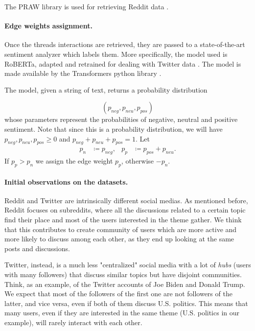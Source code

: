 The PRAW library is used for retrieving Reddit data \cite{praw}.

\paragraph{Edge weights assignment.}%
\label{par:assigning_edge_weights}

Once the threads interactions are retrieved, they are passed to a state-of-the-art
sentiment analyzer which labels them. More specifically, the model used is
RoBERTa, adapted and retrained for dealing with Twitter
data \cite{Barbieri2020}. The model is made available by the Transformers
python library \cite{wolf-etal-2020-transformers}.

The model, given a string of text, returns a probability distribution

\begin{equation*}
	(p_{neg}, p_{neu}, p_{pos})
\end{equation*}
whose parameters represent the probabilities of negative,
neutral and positive sentiment. Note that since this is a probability distribution, we will
have $p_{neg}, p_{neu}, p_{pos} \geq 0$ and $p_{neg} + p_{neu} + p_{pos} = 1$. Let
\begin{align}
	\label{eq:}
	p_n & \coloneqq p_{neg}, & p_p & \coloneqq p_{pos} + p_{neu}.
\end{align}
If $p_p > p_n $ we assign the edge weight $p_p$, otherwise $-p_n$.

%

\paragraph{Initial observations on the datasets.}
\label{sub:some_observations_on_the_datasets}
Reddit and Twitter are intrinsically different social medias. As mentioned
before, Reddit focuses on subreddits, where all the discussions related to a
certain topic find their place and most of the users interested in the
theme gather. We think that this contributes to create community of users which are more
active and more likely to discuss among each other, as they end up looking at the
same posts and discussions.

Twitter, instead, is a much less "centralized" social media with a lot of
\emph{hubs} (users with many followers) that discuss similar topics but have
disjoint communities.  Think, as an example, of the Twitter accounts of Joe
Biden and Donald Trump. We expect that most of the followers of the first one
are not followers of the latter, and vice versa, even if both of them discuss
U.S. politics. This means that many users, even if they are interested in the
same theme (U.S. politics in our example), will rarely interact with each
other.

